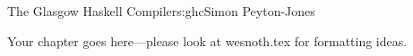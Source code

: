 \begin{aosachapter}{The Glasgow Haskell Compiler}{s:ghc}{Simon Peyton-Jones}

Your chapter goes here---please look at wesnoth.tex for formatting ideas.

\end{aosachapter}
